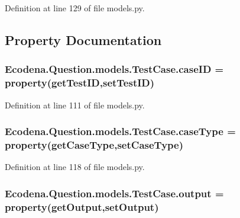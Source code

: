 Definition at line 129 of file models.py.



\subsection{Property Documentation}
\hypertarget{class_ecodena_1_1_question_1_1models_1_1_test_case_a314e803077e1703cf4bfee0d0129ae70}{
\subsubsection[{caseID}]{\setlength{\rightskip}{0pt plus 5cm}Ecodena.Question.models.TestCase.caseID = property(getTestID,setTestID)}}
\label{d4/d96/class_ecodena_1_1_question_1_1models_1_1_test_case_a314e803077e1703cf4bfee0d0129ae70}


Definition at line 111 of file models.py.

\hypertarget{class_ecodena_1_1_question_1_1models_1_1_test_case_a4a653517a014a1ba0e7d9a9f34a2b90a}{
\subsubsection[{caseType}]{\setlength{\rightskip}{0pt plus 5cm}Ecodena.Question.models.TestCase.caseType = property(getCaseType,setCaseType)}}
\label{d4/d96/class_ecodena_1_1_question_1_1models_1_1_test_case_a4a653517a014a1ba0e7d9a9f34a2b90a}


Definition at line 118 of file models.py.

\hypertarget{class_ecodena_1_1_question_1_1models_1_1_test_case_ace441542b9d9129962df0d5a1b7d969e}{
\subsubsection[{output}]{\setlength{\rightskip}{0pt plus 5cm}Ecodena.Question.models.TestCase.output = property(getOutput,setOutput)}}
\label{d4/d96/class_ecodena_1_1_question_1_1models_1_1_test_case_ace441542b9d9129962df0d5a1b7d969e}


